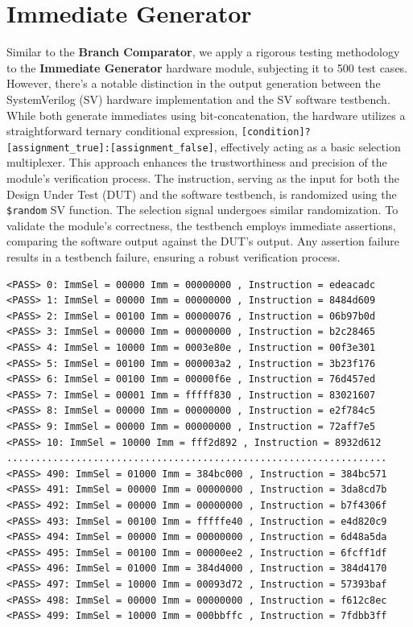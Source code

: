 \documentclass[12pt,a4paper,oneside]{book} %
\begin{document}
\section{Immediate Generator}
Similar to the \textbf{Branch Comparator}, we apply a rigorous testing methodology to the \textbf{Immediate Generator} hardware module, subjecting it to 500 test cases. However, there's a notable distinction in the output generation between the SystemVerilog (SV) hardware implementation and the SV software testbench. While both generate immediates using bit-concatenation, the hardware utilizes a straightforward ternary conditional expression, \texttt{[condition]?[assignment\_true]:[assignment\_false]}, effectively acting as a basic selection multiplexer. This approach enhances the trustworthiness and precision of the module's verification process. The instruction, serving as the input for both the Design Under Test (DUT) and the software testbench, is randomized using the \texttt{\$random} SV function. The selection signal undergoes similar randomization. To validate the module's correctness, the testbench employs immediate assertions, comparing the software output against the DUT's output. Any assertion failure results in a testbench failure, ensuring a robust verification process.
\begin{verbatim}
<PASS> 0: ImmSel = 00000 Imm = 00000000 , Instruction = edeacadc
<PASS> 1: ImmSel = 00000 Imm = 00000000 , Instruction = 8484d609
<PASS> 2: ImmSel = 00100 Imm = 00000076 , Instruction = 06b97b0d
<PASS> 3: ImmSel = 00000 Imm = 00000000 , Instruction = b2c28465
<PASS> 4: ImmSel = 10000 Imm = 0003e80e , Instruction = 00f3e301
<PASS> 5: ImmSel = 00100 Imm = 000003a2 , Instruction = 3b23f176
<PASS> 6: ImmSel = 00100 Imm = 00000f6e , Instruction = 76d457ed
<PASS> 7: ImmSel = 00001 Imm = fffff830 , Instruction = 83021607
<PASS> 8: ImmSel = 00000 Imm = 00000000 , Instruction = e2f784c5
<PASS> 9: ImmSel = 00000 Imm = 00000000 , Instruction = 72aff7e5
<PASS> 10: ImmSel = 10000 Imm = fff2d892 , Instruction = 8932d612
..................................................................
<PASS> 490: ImmSel = 01000 Imm = 384bc000 , Instruction = 384bc571
<PASS> 491: ImmSel = 00000 Imm = 00000000 , Instruction = 3da8cd7b
<PASS> 492: ImmSel = 00000 Imm = 00000000 , Instruction = b7f4306f
<PASS> 493: ImmSel = 00100 Imm = fffffe40 , Instruction = e4d820c9
<PASS> 494: ImmSel = 00000 Imm = 00000000 , Instruction = 6d48a5da
<PASS> 495: ImmSel = 00100 Imm = 00000ee2 , Instruction = 6fcff1df
<PASS> 496: ImmSel = 01000 Imm = 384d4000 , Instruction = 384d4170
<PASS> 497: ImmSel = 10000 Imm = 00093d72 , Instruction = 57393baf
<PASS> 498: ImmSel = 00000 Imm = 00000000 , Instruction = f612c8ec
<PASS> 499: ImmSel = 10000 Imm = 000bbffc , Instruction = 7fdbb3ff
\end{verbatim}
\end{document}
